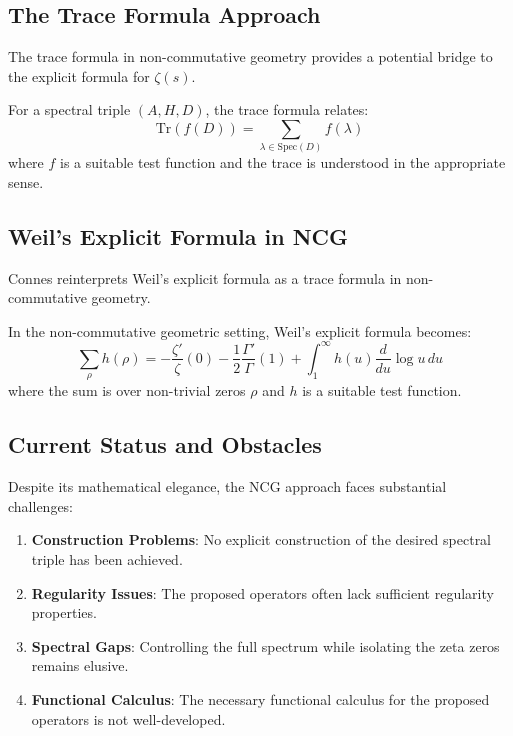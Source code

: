 \subsection{The Trace Formula Approach}

The trace formula in non-commutative geometry provides a potential bridge to the explicit formula for $\zeta(s)$.

\begin{definition}
\label{def:nc_trace_formula}
For a spectral triple $(A, H, D)$, the trace formula relates:
\begin{equation}
\text{Tr}(f(D)) = \sum_{\lambda \in \text{Spec}(D)} f(\lambda)
\label{eq:nc_trace}
\end{equation}
where $f$ is a suitable test function and the trace is understood in the appropriate sense.
\end{definition}

\subsection{Weil's Explicit Formula in NCG}

Connes reinterprets Weil's explicit formula as a trace formula in non-commutative geometry.

\begin{theorem}
\label{thm:weil_ncg}
In the non-commutative geometric setting, Weil's explicit formula becomes:
\begin{equation}
\sum_{\rho} h(\rho) = -\frac{\zeta'}{\zeta}(0) - \frac{1}{2}\frac{\Gamma'}{\Gamma}(1) + \int_1^{\infty} h(u) \frac{d}{du} \log u \, du
\label{eq:weil_ncg}
\end{equation}
where the sum is over non-trivial zeros $\rho$ and $h$ is a suitable test function.
\end{theorem}

\subsection{Current Status and Obstacles}

Despite its mathematical elegance, the NCG approach faces substantial challenges:

\begin{enumerate}
\item \textbf{Construction Problems}: No explicit construction of the desired spectral triple has been achieved.

\item \textbf{Regularity Issues}: The proposed operators often lack sufficient regularity properties.

\item \textbf{Spectral Gaps}: Controlling the full spectrum while isolating the zeta zeros remains elusive.

\item \textbf{Functional Calculus}: The necessary functional calculus for the proposed operators is not well-developed.
\end{enumerate}

